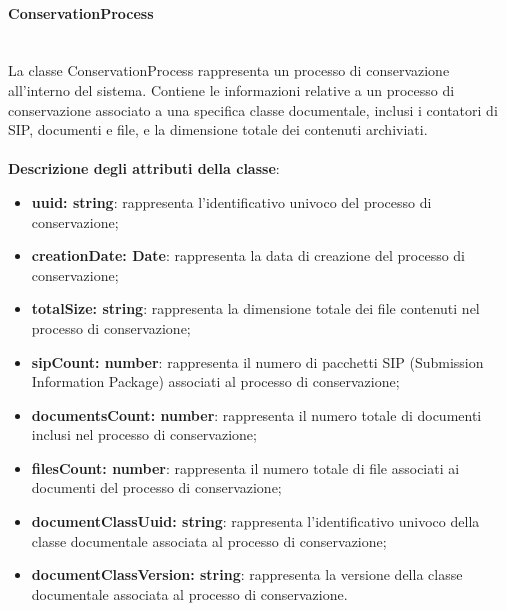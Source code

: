 \documentclass[a4paper,12pt]{article}
\begin{document}
{{{                \paragraph{ConservationProcess}\label{par:ConservationProcess}\mbox{}\\
                La classe ConservationProcess rappresenta un processo di conservazione all'interno del sistema. Contiene le informazioni relative a un processo di conservazione associato a una specifica classe documentale, inclusi i contatori di SIP, documenti e file, e la dimensione totale dei contenuti archiviati.\\
                \\
                \textbf{Descrizione degli attributi della classe}:
                \begin{itemize}
                    \item \textbf{uuid: string}: rappresenta l'identificativo univoco del processo di conservazione;
                    \item \textbf{creationDate: Date}: rappresenta la data di creazione del processo di conservazione;
                    \item \textbf{totalSize: string}: rappresenta la dimensione totale dei file contenuti nel processo di conservazione;
                    \item \textbf{sipCount: number}: rappresenta il numero di pacchetti SIP (Submission Information Package) associati al processo di conservazione;
                    \item \textbf{documentsCount: number}: rappresenta il numero totale di documenti inclusi nel processo di conservazione;
                    \item \textbf{filesCount: number}: rappresenta il numero totale di file associati ai documenti del processo di conservazione;
                    \item \textbf{documentClassUuid: string}: rappresenta l'identificativo univoco della classe documentale associata al processo di conservazione;
                    \item \textbf{documentClassVersion: string}: rappresenta la versione della classe documentale associata al processo di conservazione.
                \end{itemize}
 
}}}
\end{document}
